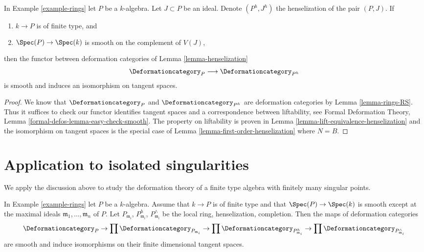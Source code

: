 \begin{lemma}
\label{lemma-smooth-henselization}
In Example \ref{example-rings} let $P$ be a $k$-algebra.
Let $J \subset P$ be an ideal.
Denote $(P^h, J^h)$ the henselization of the pair $(P, J)$. If
\begin{enumerate}
\item $k \to P$ is of finite type, and
\item $\Spec(P) \to \Spec(k)$ is smooth on the complement of $V(J)$,
\end{enumerate}
then the functor between deformation categories of
Lemma \ref{lemma-henselization}
$$
\Deformationcategory_P \longrightarrow \Deformationcategory_{P^h}
$$
is smooth and induces an isomorphism on tangent spaces.
\end{lemma}

\begin{proof}
We know that $\Deformationcategory_P$ and $\Deformationcategory_{P^h}$
are deformation categories by Lemma \ref{lemma-rings-RS}.
Thus it suffices to check
our functor identifies tangent spaces and a correspondence
between liftability, see
Formal Deformation Theory, Lemma \ref{formal-defos-lemma-easy-check-smooth}.
The property on liftability is proven in
Lemma \ref{lemma-lift-equivalence-henselization}
and the isomorphism on tangent spaces is the special case of
Lemma \ref{lemma-first-order-henselization} where $N = B$.
\end{proof}



\section{Application to isolated singularities}
\label{section-isolated}

\noindent
We apply the discussion above to study the deformation theory
of a finite type algebra with finitely many singular points.

\begin{lemma}
\label{lemma-isolated}
In Example \ref{example-rings} let $P$ be a $k$-algebra.
Assume that $k \to P$ is of finite type and that $\Spec(P) \to \Spec(k)$
is smooth except at the maximal ideals
$\mathfrak m_1, \ldots, \mathfrak m_n$ of $P$.
Let $P_{\mathfrak m_i}$, $P_{\mathfrak m_i}^h$, $P_{\mathfrak m_i}^\wedge$
be the local ring, henselization, completion.
Then the maps of deformation categories
$$
\Deformationcategory_P \to
\prod \Deformationcategory_{P_{\mathfrak m_i}} \to
\prod \Deformationcategory_{P_{\mathfrak m_i}^h} \to
\prod \Deformationcategory_{P_{\mathfrak m_i}^\wedge}
$$
are smooth and induce isomorphisms on their finite dimensional
tangent spaces.
\end{lemma}

